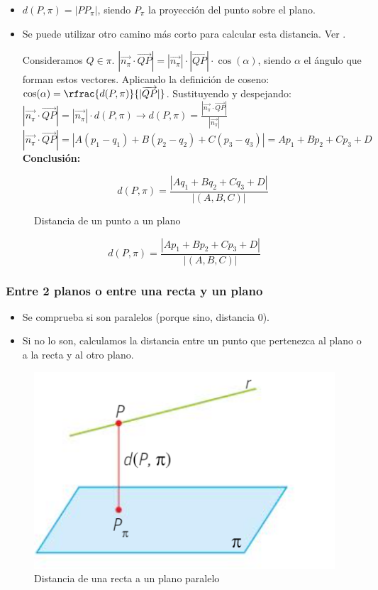\begin{itemize}
  \item $d(P,\pi) = |PP_{\pi}|$, siendo $P_{\pi}$ la proyección del punto sobre el plano.
  \item Se puede utilizar otro camino más corto para calcular esta distancia. Ver .

  \subitem Consideramos $Q\in\pi$.
  \subitem $|\vec{n_{\pi}}·\vec{QP}| = |\vec{n_{\pi}}|·|\vec{QP}|·\cos(\alpha)$, siendo $\alpha$ el ángulo que forman estos vectores.
  \subitem Aplicando la definición de coseno: $\cos(\alpha) = \rfrac{d(P,\pi)}{|\vec{QP}|}$.
  \subitem Sustituyendo y despejando: $|\vec{n_{\pi}}·\vec{QP}| = |\vec{n_{\pi}}|·d(P,\pi) \to d(P,\pi) = \frac{|\vec{n_{\pi}}·\vec{QP}|}{|\vec{n_{\pi}}|}$
  \subitem $|\vec{n_{\pi}}·\vec{QP}| = |A(p_1-q_1) + B(p_2-q_2) + C(p_3-q_3)| = Ap_1+Bp_2+Cp_3+D$
  \subitem \textbf{Conclusión:}

  \[
    d(P,\pi) = \frac{|Aq_1+Bq_2+Cq_3+D|}{|(A,B,C)|}
  \]
\end{itemize}

\begin{figure}[H]
\centering
{}

\caption{Distancia de un punto a un plano}
\label{fig::dist-punto-plano}
\end{figure}


\[d(P,\pi) = \frac{|Ap_1+Bp_2+Cp_3+D|}{|(A,B,C)|}\]

\subsubsection{Entre 2 planos o entre una recta y un plano}

\begin{itemize}
  \item Se comprueba si son paralelos (porque sino, distancia 0).
  \item Si no lo son, calculamos la distancia entre un punto que pertenezca al plano o a la recta y al otro plano.
\end{itemize}


\begin{figure}[H]
\centering
\includegraphics[scale=0.6]{img/dist-recta-plano.png}
\caption{Distancia de una recta a un plano paralelo}
\label{fig::dist-recta-plano}
\end{figure}


